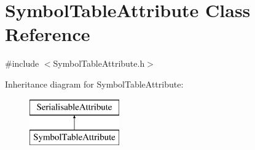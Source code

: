 \hypertarget{classSymbolTableAttribute}{}\section{Symbol\+Table\+Attribute Class Reference}
\label{classSymbolTableAttribute}


{\ttfamily \#include $<$Symbol\+Table\+Attribute.\+h$>$}

Inheritance diagram for Symbol\+Table\+Attribute\+:\begin{figure}[H]
\begin{center}
\leavevmode
\includegraphics[height=2.000000cm]{classSymbolTableAttribute}
\end{center}
\end{figure}
